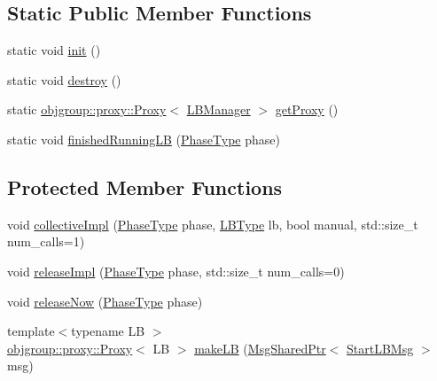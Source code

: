 \subsection*{Static Public Member Functions}
\begin{DoxyCompactItemize}
\item 
static void \hyperlink{structvt_1_1vrt_1_1collection_1_1balance_1_1_l_b_manager_aaee7e85b5572e84723eb6198326b76a8}{init} ()
\item 
static void \hyperlink{structvt_1_1vrt_1_1collection_1_1balance_1_1_l_b_manager_a2cb851831494ddc59c0e4f12d845a884}{destroy} ()
\item 
static \hyperlink{structvt_1_1objgroup_1_1proxy_1_1_proxy}{objgroup\+::proxy\+::\+Proxy}$<$ \hyperlink{structvt_1_1vrt_1_1collection_1_1balance_1_1_l_b_manager}{L\+B\+Manager} $>$ \hyperlink{structvt_1_1vrt_1_1collection_1_1balance_1_1_l_b_manager_a53b7b5a5ccd63e0af55f88c5abb4534c}{get\+Proxy} ()
\item 
static void \hyperlink{structvt_1_1vrt_1_1collection_1_1balance_1_1_l_b_manager_af78c27f2e951e965e287273461ad1d3e}{finished\+Running\+LB} (\hyperlink{namespacevt_a46ce6733d5cdbd735d561b7b4029f6d7}{Phase\+Type} phase)
\end{DoxyCompactItemize}
\subsection*{Protected Member Functions}
\begin{DoxyCompactItemize}
\item 
void \hyperlink{structvt_1_1vrt_1_1collection_1_1balance_1_1_l_b_manager_a591eef7303a18ce4ef2fd35cfecbf512}{collective\+Impl} (\hyperlink{namespacevt_a46ce6733d5cdbd735d561b7b4029f6d7}{Phase\+Type} phase, \hyperlink{namespacevt_1_1vrt_1_1collection_1_1balance_ac4f99693509affcc67db182d4aad9b5c}{L\+B\+Type} lb, bool manual, std\+::size\+\_\+t num\+\_\+calls=1)
\item 
void \hyperlink{structvt_1_1vrt_1_1collection_1_1balance_1_1_l_b_manager_a7e05ed9957f272ac5cc8b999f66fa403}{release\+Impl} (\hyperlink{namespacevt_a46ce6733d5cdbd735d561b7b4029f6d7}{Phase\+Type} phase, std\+::size\+\_\+t num\+\_\+calls=0)
\item 
void \hyperlink{structvt_1_1vrt_1_1collection_1_1balance_1_1_l_b_manager_a6ed483eb58a583c48f430276c2f25c14}{release\+Now} (\hyperlink{namespacevt_a46ce6733d5cdbd735d561b7b4029f6d7}{Phase\+Type} phase)
\item 
{\footnotesize template$<$typename LB $>$ }\\\hyperlink{structvt_1_1objgroup_1_1proxy_1_1_proxy}{objgroup\+::proxy\+::\+Proxy}$<$ LB $>$ \hyperlink{structvt_1_1vrt_1_1collection_1_1balance_1_1_l_b_manager_abccd80f12ce1ced9e22f32f886a9acf6}{make\+LB} (\hyperlink{namespacevt_ab2b3d506ec8e8d1540aede826d84a239}{Msg\+Shared\+Ptr}$<$ \hyperlink{structvt_1_1vrt_1_1collection_1_1balance_1_1_start_l_b_msg}{Start\+L\+B\+Msg} $>$ msg)
\end{DoxyCompactItemize}


